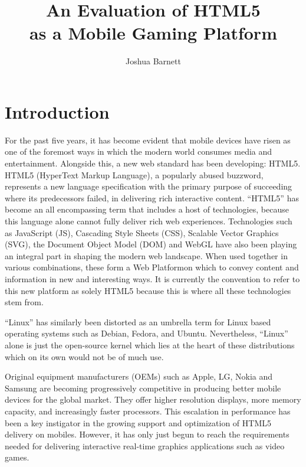 \documentclass[final]{cmpreport}
\title{An Evaluation of HTML5\\as a Mobile Gaming Platform}
\author{Joshua Barnett}
\begin{document}
\section{Introduction}
For the past five years, it has become evident that mobile devices have risen as one of the foremost ways in which the modern world consumes media and entertainment. Alongside this, a new web standard has been developing: HTML5. HTML5 (HyperText Markup Language), a popularly abused buzzword, represents a new language specification with the primary purpose of succeeding where its predecessors failed, in delivering rich interactive content. ``HTML5'' has become an all encompassing term that includes a host of technologies, because this language alone cannot fully deliver rich web experiences. Technologies such as JavaScript (JS), Cascading Style Sheets (CSS), Scalable Vector Graphics (SVG), the Document Object Model (DOM) and WebGL have also been playing an integral part in shaping the modern web landscape. When used together in various combinations, these form a Web Platform\footnotemark[1] on which to convey content and information in new and interesting ways. It is currently the convention to refer to this new platform as solely HTML5 because this is where all these technologies stem from.


``Linux'' has similarly been distorted as an umbrella term for Linux based operating systems such as Debian, Fedora, and Ubuntu. Nevertheless, ``Linux'' alone is just the open-source kernel which lies at the heart of these distributions which on its own would not be of much use.

Original equipment manufacturers (OEMs) such as Apple, LG, Nokia and Samsung are becoming progressively competitive in producing better mobile devices for the global market. They offer higher resolution displays, more memory capacity, and increasingly faster processors. This escalation in performance has been a key instigator in the growing support and optimization of HTML5 delivery on mobiles. However, it has only just begun to reach the requirements needed for delivering interactive real-time graphics applications such as video games.
\end{document}
